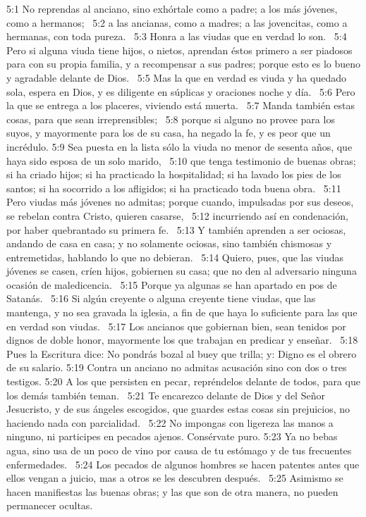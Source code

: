 5:1 No reprendas al anciano, sino exhórtale como a padre; a los más jóvenes, como a hermanos;  
5:2 a las ancianas, como a madres; a las jovencitas, como a hermanas, con toda pureza.  
5:3 Honra a las viudas que en verdad lo son.  
5:4 Pero si alguna viuda tiene hijos, o nietos, aprendan éstos primero a ser piadosos para con su propia familia, y a recompensar a sus padres; porque esto es lo bueno y agradable delante de Dios.  
5:5 Mas la que en verdad es viuda y ha quedado sola, espera en Dios, y es diligente en súplicas y oraciones noche y día.  
5:6 Pero la que se entrega a los placeres, viviendo está muerta.  
5:7 Manda también estas cosas, para que sean irreprensibles;  
5:8 porque si alguno no provee para los suyos, y mayormente para los de su casa, ha negado la fe, y es peor que un incrédulo. 
5:9 Sea puesta en la lista sólo la viuda no menor de sesenta años, que haya sido esposa de un solo marido,  
5:10 que tenga testimonio de buenas obras; si ha criado hijos; si ha practicado la hospitalidad; si ha lavado los pies de los santos; si ha socorrido a los afligidos; si ha practicado toda buena obra.  
5:11 Pero viudas más jóvenes no admitas; porque cuando, impulsadas por sus deseos, se rebelan contra Cristo, quieren casarse,  
5:12 incurriendo así en condenación, por haber quebrantado su primera fe.  
5:13 Y también aprenden a ser ociosas, andando de casa en casa; y no solamente ociosas, sino también chismosas y entremetidas, hablando lo que no debieran.  
5:14 Quiero, pues, que las viudas jóvenes se casen, críen hijos, gobiernen su casa; que no den al adversario ninguna ocasión de maledicencia.  
5:15 Porque ya algunas se han apartado en pos de Satanás.  
5:16 Si algún creyente o alguna creyente tiene viudas, que las mantenga, y no sea gravada la iglesia, a fin de que haya lo suficiente para las que en verdad son viudas.  
5:17 Los ancianos que gobiernan bien, sean tenidos por dignos de doble honor, mayormente los que trabajan en predicar y enseñar.  
5:18 Pues la Escritura dice: No pondrás bozal al buey que trilla; y: Digno es el obrero de su salario. 
5:19 Contra un anciano no admitas acusación sino con dos o tres testigos. 
5:20 A los que persisten en pecar, repréndelos delante de todos, para que los demás también teman.  
5:21 Te encarezco delante de Dios y del Señor Jesucristo, y de sus ángeles escogidos, que guardes estas cosas sin prejuicios, no haciendo nada con parcialidad.  
5:22 No impongas con ligereza las manos a ninguno, ni participes en pecados ajenos. Consérvate puro. 
5:23 Ya no bebas agua, sino usa de un poco de vino por causa de tu estómago y de tus frecuentes enfermedades.  
5:24 Los pecados de algunos hombres se hacen patentes antes que ellos vengan a juicio, mas a otros se les descubren después.  
5:25 Asimismo se hacen manifiestas las buenas obras; y las que son de otra manera, no pueden permanecer ocultas.  

